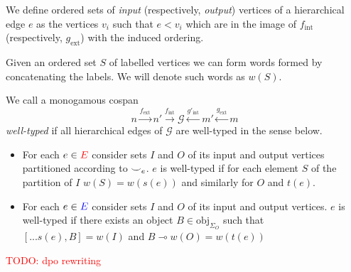 \begin{definition}

We define ordered sets of \textit{input} (respectively, \textit{output}) vertices of a hierarchical edge $e$ as the vertices $v_{i}$ such that $e < v_{i}$ which are in the image of $f_{\text{int}}$ (respectively, $g_{\text{ext}}$) with the induced ordering.
\end{definition}

\begin{definition}

Given an ordered set $S$ of labelled vertices we can form words formed by concatenating the labels.
We will denote such words as $w(S)$.
\end{definition}

\begin{definition}
We call a monogamous cospan
\[
  n \xrightarrow{f_{\text{ext}}} n' \xrightarrow{f_{\text{int}}} \mathcal{G} \xleftarrow{g'_{\text{int}}} m' \xleftarrow{g_{\text{ext}}} m
\]
\textit{well-typed} if all hierarchical edges of $\mathcal{G}$ are well-typed in the sense below.
\begin{itemize}
  \item For each $e \in \textcolor{red}{E}$ consider sets $I$ and $O$ of its input and output vertices partitioned according to ${\smile}_{e}$.
        $e$ is well-typed if for each element $S$ of the partition of $I$ $w(S) = w(s(e))$ and similarly for $O$ and $t(e)$.
  \item For each $e \in \textcolor{blue}{E}$ consider sets $I$ and $O$ of its input and output vertices.
        $e$ is well-typed if there exists an object $B \in \text{obj}_{\Sigma_{O}}$ such that $[...s(e), B] = w(I)$ and $B \multimap w(O) = w(t(e))$
\end{itemize}
\end{definition}

\textcolor{red}{TODO: dpo rewriting}